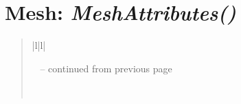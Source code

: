\documentclass[letterpaper,10pt,english]{sphinxmanual}
\begin{document}
\section{\textbf{Mesh}: \emph{MeshAttributes()}}
\label{attributes:mesh-meshattributes}
\begin{DUlineblock}{0em}
\item[] 
\end{DUlineblock}
\begin{quote}

\begin{longtable}{|l|l|}
\hline
\endfirsthead

%
{{\textsf{\tablename\ \thetable{} -- continued from previous page}}} \\
\hline
\endhead

\hline {} \\ \hline
\endfoot

\endlastfoot



\end{longtable}
\end{quote}
\end{document}
